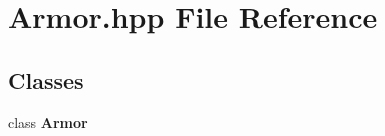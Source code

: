 \section{Armor.\-hpp File Reference}
\label{_armor_8hpp}
\subsection*{Classes}
\begin{DoxyCompactItemize}
\item 
class {\bf Armor}
\end{DoxyCompactItemize}
